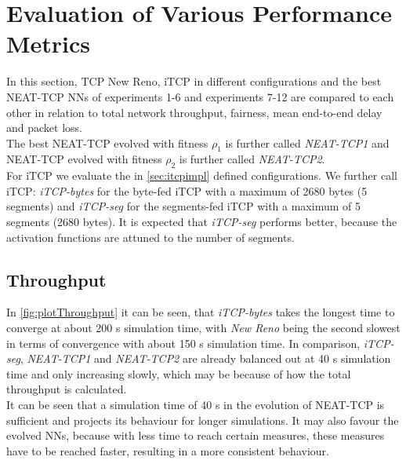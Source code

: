 \section{Evaluation of Various Performance Metrics}\label{sec:resCompare}
In this section, TCP New Reno, iTCP in different configurations and the best NEAT-TCP NNs of experiments 1-6 and experiments 7-12 are compared to each other in relation to total network throughput, fairness, mean end-to-end delay and packet loss.\\
The best NEAT-TCP evolved with fitness $\rho_1$ is further called \textit{NEAT-TCP1} and NEAT-TCP evolved with fitness $\rho_2$ is further called \textit{NEAT-TCP2}.\\
For iTCP we evaluate the in \autoref{sec:itcpimpl} defined configurations. We further call iTCP: \textit{iTCP-bytes} for the byte-fed iTCP with a maximum of 2680 bytes (5 segments) and \textit{iTCP-seg} for the segments-fed iTCP with a maximum of 5 segments (2680 bytes). It is expected that \textit{iTCP-seg} performs better, because the activation functions are attuned to the number of segments. \\


\subsection{Throughput}\label{subsec:throughput}
In \autoref{fig:plotThroughput} it can be seen, that \textit{iTCP-bytes} takes the longest time to converge at about 200 s simulation time, with \textit{New Reno} being the second slowest in terms of convergence with about 150 s simulation time. In comparison, \textit{iTCP-seg}, \textit{NEAT-TCP1} and \textit{NEAT-TCP2} are already balanced out at 40 s simulation time and only increasing slowly, which may be because of how the total throughput is calculated. \\
It can be seen that a simulation time of 40 s in the evolution of NEAT-TCP is sufficient and projects its behaviour for longer simulations. It may also favour the evolved NNs, because with less time to reach certain measures, these measures have to be reached faster, resulting in a more consistent behaviour.

